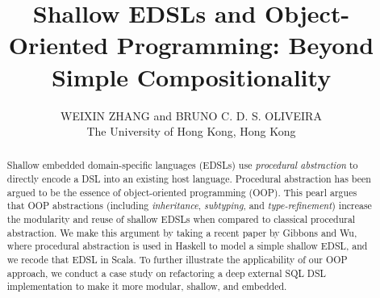 \documentclass{jfp1}
\newcommand{\an}[3]{{\color{#2} {\sc #1}:#3}}
\newcommand{\bruno}[1]{\an{bruno}{blue}{#1}}
\begin{document}
\title{Shallow EDSLs and Object-Oriented Programming: Beyond Simple Compositionality}

\author[W. Zhang and B. Oliveira]
        {WEIXIN ZHANG and BRUNO C. D. S. OLIVEIRA\\
         The University of Hong Kong, Hong Kong}

\maketitle[f]

\begin{abstract}
Shallow embedded domain-specific languages (EDSLs) use
\emph{procedural abstraction} to directly encode a DSL into an existing host language. Procedural abstraction has
been argued to be the essence of object-oriented programming (OOP).
This pearl argues that OOP abstractions
(including \emph{inheritance}, \emph{subtyping}, and
\emph{type-refinement})
increase the modularity and reuse of shallow
EDSLs when compared to classical procedural abstraction. We make this
argument by taking a recent paper by Gibbons and Wu, where procedural
abstraction is used in Haskell to model a simple shallow EDSL, and we recode
that EDSL in Scala. 
To further illustrate the applicability of our OOP approach, we conduct
a case study on refactoring a deep external SQL DSL implementation to make it
more modular, shallow, and embedded.
\end{abstract}














\vspace{-7pt}


\end{document}
